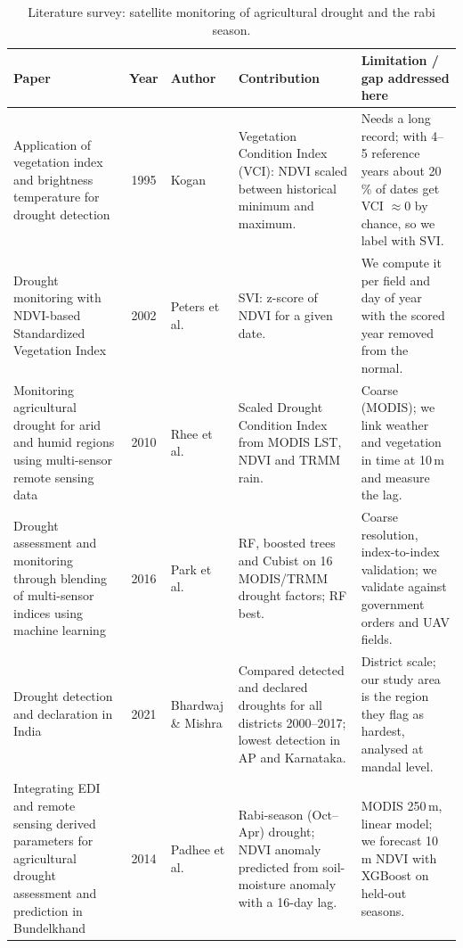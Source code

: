 \documentclass[11pt,a4paper,oneside]{article}
\renewcommand{\arraystretch}{1.0}
\begin{document}
\begin{table}[H]
\centering
\caption{Literature survey: satellite monitoring of agricultural drought and the rabi season.}
\label{tab:lit_sat}
\scriptsize
\renewcommand{\arraystretch}{1.05}
\begin{tabularx}{\textwidth}{@{}p{3.1cm}|c|p{2.2cm}|X|X@{}}
\hline
\textbf{Paper} & \textbf{Year} & \textbf{Author} & \textbf{Contribution} & \textbf{Limitation / gap addressed here} \\
\hline
Application of vegetation index and brightness temperature for drought detection~\cite{kogan1995} & 1995 & Kogan & Vegetation Condition Index (VCI): NDVI scaled between historical minimum and maximum. & Needs a long record; with 4--5 reference years about 20\,\% of dates get VCI $\approx 0$ by chance, so we label with SVI. \\
\hline
Drought monitoring with NDVI-based Standardized Vegetation Index~\cite{peters2002} & 2002 & Peters et al. & SVI: z-score of NDVI for a given date. & We compute it per field and day of year with the scored year removed from the normal. \\
\hline
Monitoring agricultural drought for arid and humid regions using multi-sensor remote sensing data~\cite{rhee2010} & 2010 & Rhee et al. & Scaled Drought Condition Index from MODIS LST, NDVI and TRMM rain. & Coarse (MODIS); we link weather and vegetation in time at 10\,m and measure the lag. \\
\hline
Drought assessment and monitoring through blending of multi-sensor indices using machine learning~\cite{park2016} & 2016 & Park et al. & RF, boosted trees and Cubist on 16 MODIS/TRMM drought factors; RF best. & Coarse resolution, index-to-index validation; we validate against government orders and UAV fields. \\
\hline
Drought detection and declaration in India~\cite{bhardwaj2021} & 2021 & Bhardwaj \& Mishra & Compared detected and declared droughts for all districts 2000--2017; lowest detection in AP and Karnataka. & District scale; our study area is the region they flag as hardest, analysed at mandal level. \\
\hline
Integrating EDI and remote sensing derived parameters for agricultural drought assessment and prediction in Bundelkhand~\cite{padhee2014} & 2014 & Padhee et al. & Rabi-season (Oct--Apr) drought; NDVI anomaly predicted from soil-moisture anomaly with a 16-day lag. & MODIS 250\,m, linear model; we forecast 10\,m NDVI with XGBoost on held-out seasons. \\

\end{tabularx}
\end{table}
\end{document}
